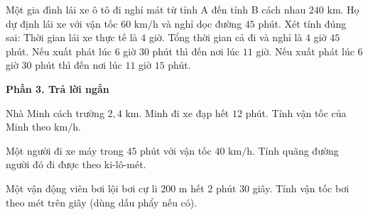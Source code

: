 \begin{ex} %
Một gia đình lái xe ô tô đi nghỉ mát từ tỉnh A đến tỉnh B cách nhau $240\text{ km}$. Họ dự định lái xe với vận tốc $60\text{ km/h}$ và nghỉ dọc đường $45$ phút. Xét tính đúng sai:
\choiceTF
{\True Thời gian lái xe thực tế là $4$ giờ.}
{\True Tổng thời gian cả đi và nghỉ là $4$ giờ $45$ phút.}
{Nếu xuất phát lúc $6$ giờ $30$ phút thì đến nơi lúc $11$ giờ.}
{\True Nếu xuất phát lúc $6$ giờ $30$ phút thì đến nơi lúc $11$ giờ $15$ phút.}
\end{ex}

\textbf{Phần 3. Trả lời ngắn}

\begin{ex} %
Nhà Minh cách trường $2{,}4\text{ km}$. Minh đi xe đạp hết $12$ phút. Tính vận tốc của Minh theo $\text{km/h}$.
\end{ex}

\begin{ex} %
Một người đi xe máy trong $45$ phút với vận tốc $40\text{ km/h}$. Tính quãng đường người đó đi được theo ki-lô-mét.
\end{ex}

\begin{ex} %
Một vận động viên bơi lội bơi cự li $200\text{ m}$ hết $2$ phút $30$ giây. Tính vận tốc bơi theo mét trên giây (dùng dấu phẩy nếu có).
\end{ex}

